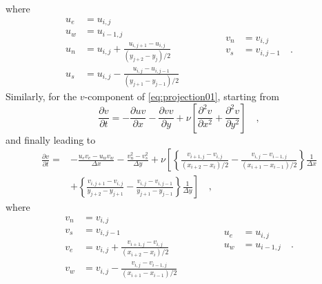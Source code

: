 \documentclass[12pt,a4paper,fleqn]{article}
\begin{document}
    where
    \begin{equation*}
    \begin{aligned}
    u_e &= u_{i,j}\\
    u_w &= u_{i-1,j}\\
    u_n &= u_{i,j} + \frac{u_{i,j+1} - u_{i,j}}{(y_{j+2}-y_j)/2}\\
    u_s &= u_{i,j} - \frac{u_{i,j} - u_{i,j-1}}{(y_{j+1}-y_{j-1})/2}
    \end{aligned}
    \qquad\qquad
    \begin{aligned}
    v_n &= v_{i,j}\\
    v_s &= v_{i,j-1}\quad .\\
    {}\\
    {}\\
    {}
    \end{aligned}
    \end{equation*}
    Similarly, for the $v$-component of \eqref{eq:projection01}, starting from
    \begin{equation} \label{eq:convective-diffusive-v}
    \frac{\partial v}{\partial t} = -\frac{\partial uv}{\partial x} -\frac{\partial vv}{\partial y} + \nu\left[\frac{\partial^2v}{\partial x^2} + \frac{\partial^2v}{\partial y^2}\right] \quad ,
    \end{equation}
    and finally leading to
    \begin{align}\label{eq:discretized_convective-diffusive-v03}
    \frac{\partial v}{\partial t} =
    {}& - \frac{u_e v_e - u_w v_w}{\Delta x} - \frac{v_n^2 - v_s^2}{\Delta y} + \nu\left[
    \left\{
    \frac{v_{i+1,j}-v_{i,j}}{(x_{i+2}-x_i)/2}
    - \frac{v_{i,j}-v_{i-1,j}}{(x_{i+1}-x_{i-1})/2}
    \right\}
    \frac{1}{\Delta x}
    \right.\nonumber\\
    & \left. + \left\{
    \frac{v_{i,j+1}-v_{i,j}}{y_{j+2}-y_{j+1}}
    - \frac{v_{i,j}-v_{i,j-1}}{y_{j+1}-y_{j-1}}
    \right\}
    \frac{1}{\Delta y}
    \right] \quad ,
    \end{align}
    where
    \begin{equation*}
    \begin{aligned}
    v_n &= v_{i,j}\\
    v_s &= v_{i,j-1}\\
    v_e &= v_{i,j} + \frac{v_{i+1,j} - v_{i,j}}{(x_{i+2}-x_i)/2}\\
    v_w &= v_{i,j} - \frac{v_{i,j} - v_{i-1,j}}{(x_{i+1}-x_{i-1})/2}
    \end{aligned}
    \qquad\qquad
    \begin{aligned}
    u_e &= u_{i,j}\\
    u_w &= u_{i-1,j}\quad .\\
    {}\\
    {}\\
    {}
    \end{aligned}
    \end{equation*}
\end{document}
